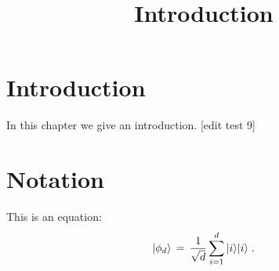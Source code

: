 

%


\title{Introduction}
\label{introduction}


\maketitle


\tableofcontents

\section{Introduction}
\label{section:introduction}

In this chapter we give an introduction. [edit test 9]

\section{Notation}
\label{section-notation}

This is an equation:
\begin{equation}
\label{eq:me-state}
 |\phi_d\rangle \,=\,\frac{1}{\sqrt{d}} \sum_{i=1}^d |i\rangle|i\rangle\;.
\end{equation}








